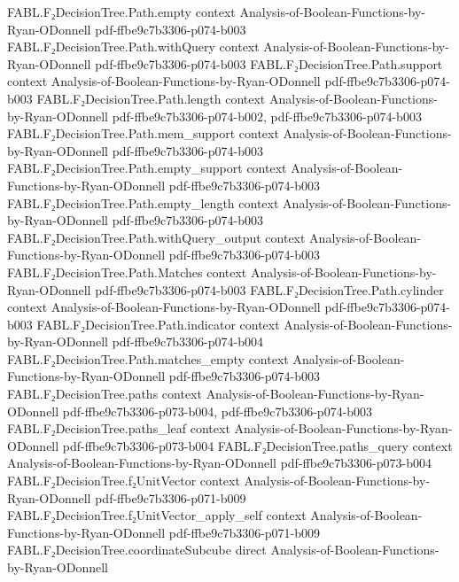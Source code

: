 \begin{theorem}
\proofstep
  {FABL.F₂DecisionTree.Path.empty}
  {context}
  {Analysis-of-Boolean-Functions-by-Ryan-ODonnell}
  {pdf-ffbe9c7b3306-p074-b003}
\proofstep
  {FABL.F₂DecisionTree.Path.withQuery}
  {context}
  {Analysis-of-Boolean-Functions-by-Ryan-ODonnell}
  {pdf-ffbe9c7b3306-p074-b003}
\proofstep
  {FABL.F₂DecisionTree.Path.support}
  {context}
  {Analysis-of-Boolean-Functions-by-Ryan-ODonnell}
  {pdf-ffbe9c7b3306-p074-b003}
\proofstep
  {FABL.F₂DecisionTree.Path.length}
  {context}
  {Analysis-of-Boolean-Functions-by-Ryan-ODonnell}
  {pdf-ffbe9c7b3306-p074-b002,
    pdf-ffbe9c7b3306-p074-b003}
\proofstep
  {FABL.F₂DecisionTree.Path.mem_support}
  {context}
  {Analysis-of-Boolean-Functions-by-Ryan-ODonnell}
  {pdf-ffbe9c7b3306-p074-b003}
\proofstep
  {FABL.F₂DecisionTree.Path.empty_support}
  {context}
  {Analysis-of-Boolean-Functions-by-Ryan-ODonnell}
  {pdf-ffbe9c7b3306-p074-b003}
\proofstep
  {FABL.F₂DecisionTree.Path.empty_length}
  {context}
  {Analysis-of-Boolean-Functions-by-Ryan-ODonnell}
  {pdf-ffbe9c7b3306-p074-b003}
\proofstep
  {FABL.F₂DecisionTree.Path.withQuery_output}
  {context}
  {Analysis-of-Boolean-Functions-by-Ryan-ODonnell}
  {pdf-ffbe9c7b3306-p074-b003}
\proofstep
  {FABL.F₂DecisionTree.Path.Matches}
  {context}
  {Analysis-of-Boolean-Functions-by-Ryan-ODonnell}
  {pdf-ffbe9c7b3306-p074-b003}
\proofstep
  {FABL.F₂DecisionTree.Path.cylinder}
  {context}
  {Analysis-of-Boolean-Functions-by-Ryan-ODonnell}
  {pdf-ffbe9c7b3306-p074-b003}
\proofstep
  {FABL.F₂DecisionTree.Path.indicator}
  {context}
  {Analysis-of-Boolean-Functions-by-Ryan-ODonnell}
  {pdf-ffbe9c7b3306-p074-b004}
\proofstep
  {FABL.F₂DecisionTree.Path.matches_empty}
  {context}
  {Analysis-of-Boolean-Functions-by-Ryan-ODonnell}
  {pdf-ffbe9c7b3306-p074-b003}
\proofstep
  {FABL.F₂DecisionTree.paths}
  {context}
  {Analysis-of-Boolean-Functions-by-Ryan-ODonnell}
  {pdf-ffbe9c7b3306-p073-b004,
    pdf-ffbe9c7b3306-p074-b003}
\proofstep
  {FABL.F₂DecisionTree.paths_leaf}
  {context}
  {Analysis-of-Boolean-Functions-by-Ryan-ODonnell}
  {pdf-ffbe9c7b3306-p073-b004}
\proofstep
  {FABL.F₂DecisionTree.paths_query}
  {context}
  {Analysis-of-Boolean-Functions-by-Ryan-ODonnell}
  {pdf-ffbe9c7b3306-p073-b004}
\proofstep
  {FABL.F₂DecisionTree.f₂UnitVector}
  {context}
  {Analysis-of-Boolean-Functions-by-Ryan-ODonnell}
  {pdf-ffbe9c7b3306-p071-b009}
\proofstep
  {FABL.F₂DecisionTree.f₂UnitVector_apply_self}
  {context}
  {Analysis-of-Boolean-Functions-by-Ryan-ODonnell}
  {pdf-ffbe9c7b3306-p071-b009}
\proofstep
  {FABL.F₂DecisionTree.coordinateSubcube}
  {direct}
  {Analysis-of-Boolean-Functions-by-Ryan-ODonnell}

\end{theorem}
